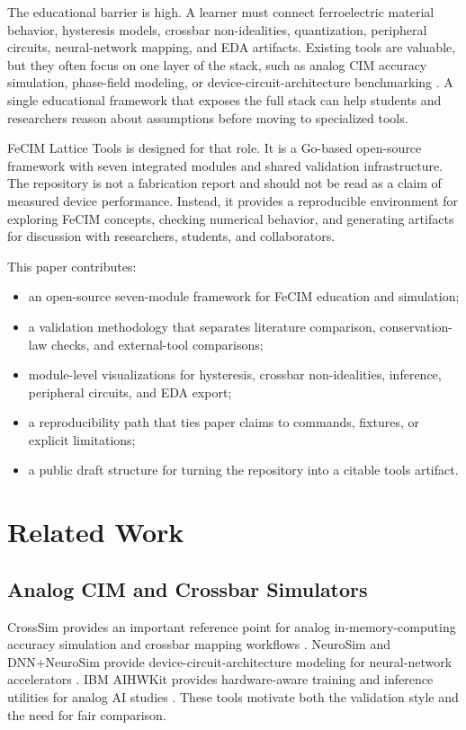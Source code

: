 \documentclass[11pt]{article}
\newcommand{\project}{FeCIM Lattice Tools}
\begin{document}
The educational barrier is high. A learner must connect ferroelectric material behavior, hysteresis models, crossbar non-idealities, quantization, peripheral circuits, neural-network mapping, and EDA artifacts. Existing tools are valuable, but they often focus on one layer of the stack, such as analog CIM accuracy simulation, phase-field modeling, or device-circuit-architecture benchmarking \citep{crosssim,neurosim,aihwkit,ferrox}. A single educational framework that exposes the full stack can help students and researchers reason about assumptions before moving to specialized tools.

\project{} is designed for that role. It is a Go-based open-source framework with seven integrated modules and shared validation infrastructure. The repository is not a fabrication report and should not be read as a claim of measured device performance. Instead, it provides a reproducible environment for exploring FeCIM concepts, checking numerical behavior, and generating artifacts for discussion with researchers, students, and collaborators.

This paper contributes:

\begin{itemize}
  \item an open-source seven-module framework for FeCIM education and simulation;
  \item a validation methodology that separates literature comparison, conservation-law checks, and external-tool comparisons;
  \item module-level visualizations for hysteresis, crossbar non-idealities, inference, peripheral circuits, and EDA export;
  \item a reproducibility path that ties paper claims to commands, fixtures, or explicit limitations;
  \item a public draft structure for turning the repository into a citable tools artifact.
\end{itemize}

\section{Related Work}

\subsection{Analog CIM and Crossbar Simulators}

CrossSim provides an important reference point for analog in-memory-computing accuracy simulation and crossbar mapping workflows \citep{crosssim2024,crosssimWebsite}. NeuroSim and DNN+NeuroSim provide device-circuit-architecture modeling for neural-network accelerators \citep{neurosim2021}. IBM AIHWKit provides hardware-aware training and inference utilities for analog AI studies \citep{aihwkit}. These tools motivate both the validation style and the need for fair comparison.
\end{document}
